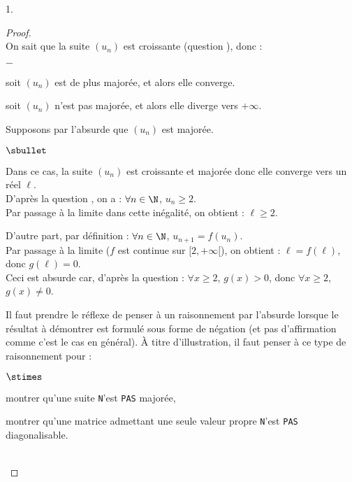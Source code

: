 \begin{noliste}{1.}
  \begin{proof}~\\
    On sait que la suite $(u_n)$ est croissante (question
    ), donc :
    \begin{noliste}{$-$}
    \item soit $(u_n)$ est de plus majorée, et alors elle converge.
    \item soit $(u_n)$ n'est pas majorée, et alors elle diverge vers 
      $+\infty$.
    \end{noliste}
    Supposons par l'absurde que $(u_n)$ est majorée.
    \begin{noliste}{$\sbullet$}
    \item Dans ce cas, la suite $(u_n)$ est croissante et majorée donc
      elle converge vers un réel $\ell$.\\
      D'après la question , on a : $\forall n\in\N$, $u_n
      \geq 2$.\\
      Par passage à la limite dans cette inégalité, on obtient : $\ell
      \geq 2$.
      
    \item D'autre part, par définition : $\forall n\in\N$,
      $u_{n+1}=f(u_n)$.\\
      Par passage à la limite ($f$ est continue sur $[2,+\infty[$), on
      obtient : $\ell = f(\ell)$, donc $g(\ell)=0$.\\
      Ceci est absurde car, d'après la question  : $\forall
      x\geq 2$, $g(x)>0$, donc $\forall x\geq 2$, $g(x)\neq 0$.
    \end{noliste}


    \newpage


    \begin{remark}%
      Il faut prendre le réflexe de penser à un raisonnement par
      l'absurde lorsque le résultat à démontrer est formulé sous forme
      de négation (et pas d'affirmation comme c'est le cas en
      général). À titre d'illustration, il faut penser à ce type de
      raisonnement pour :
      \begin{noliste}{$\stimes$}
      \item montrer qu'une suite {\tt N}'est {\tt PAS} majorée,
      \item montrer qu'une matrice admettant une seule valeur propre
        {\tt N}'est {\tt PAS} diagonalisable.
      \end{noliste}
    \end{remark}~\\[-1.4cm]
  \end{proof}


\end{noliste}

